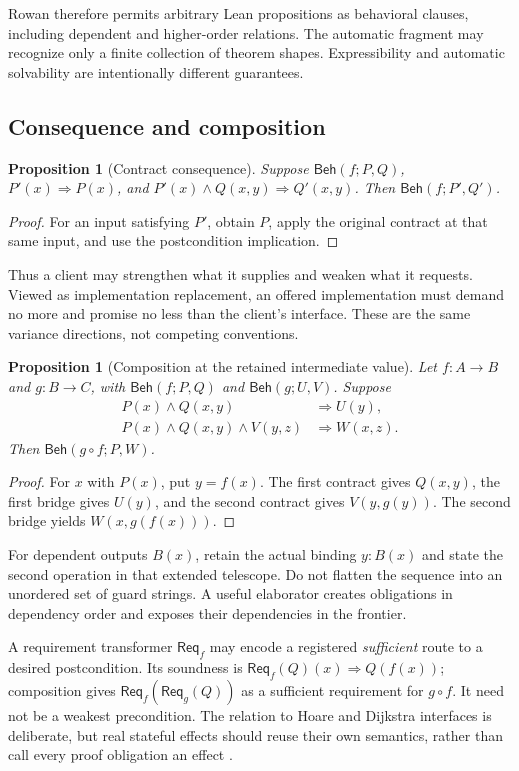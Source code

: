 \documentclass[11pt,letterpaper]{article}
\newcommand{\Beh}{\mathsf{Beh}}\newcommand{\Req}{\mathsf{Req}}
\newtheorem{proposition}[theorem]{Proposition}
\theoremstyle{definition}\newtheorem{definition}[theorem]{Definition}
\theoremstyle{remark}\newtheorem{remark}[theorem]{Remark}
\begin{document}
Rowan therefore permits arbitrary Lean propositions as behavioral clauses,
including dependent and higher-order relations. The automatic fragment may
recognize only a finite collection of theorem shapes. Expressibility and
automatic solvability are intentionally different guarantees.

\subsection{Consequence and composition}
\begin{proposition}[Contract consequence]
Suppose $\Beh(f;P,Q)$, $P'(x)\Rightarrow P(x)$, and
$P'(x)\wedge Q(x,y)\Rightarrow Q'(x,y)$. Then $\Beh(f;P',Q')$.
\end{proposition}
\begin{proof}
For an input satisfying $P'$, obtain $P$, apply the original contract at that
same input, and use the postcondition implication.
\end{proof}

Thus a client may strengthen what it supplies and weaken what it requests.
Viewed as implementation replacement, an offered implementation must demand
no more and promise no less than the client's interface. These are the same
variance directions, not competing conventions.

\begin{proposition}[Composition at the retained intermediate value]
Let $f:A\to B$ and $g:B\to C$, with $\Beh(f;P,Q)$ and
$\Beh(g;U,V)$. Suppose
\begin{align*}
 P(x)\wedge Q(x,y)&\Longrightarrow U(y),\\
 P(x)\wedge Q(x,y)\wedge V(y,z)&\Longrightarrow W(x,z).
\end{align*}
Then $\Beh(g\circ f;P,W)$.
\end{proposition}
\begin{proof}
For $x$ with $P(x)$, put $y=f(x)$. The first contract gives $Q(x,y)$,
the first bridge gives $U(y)$, and the second contract gives $V(y,g(y))$.
The second bridge yields $W(x,g(f(x)))$.
\end{proof}

For dependent outputs $B(x)$, retain the actual binding $y:B(x)$ and state
the second operation in that extended telescope. Do not flatten the sequence
into an unordered set of guard strings. A useful elaborator creates obligations
in dependency order and exposes their dependencies in the frontier.

A requirement transformer $\Req_f$ may encode a registered \emph{sufficient}
route to a desired postcondition. Its soundness is
$\Req_f(Q)(x)\Rightarrow Q(f(x))$; composition gives
$\Req_f(\Req_g(Q))$ as a sufficient requirement for $g\circ f$.
It need not be a weakest precondition. The relation to Hoare and Dijkstra
interfaces is deliberate, but real stateful effects should reuse their own
semantics, rather than call every proof obligation an effect
\cite{dijkstra,mvcgen}.
\end{document}

